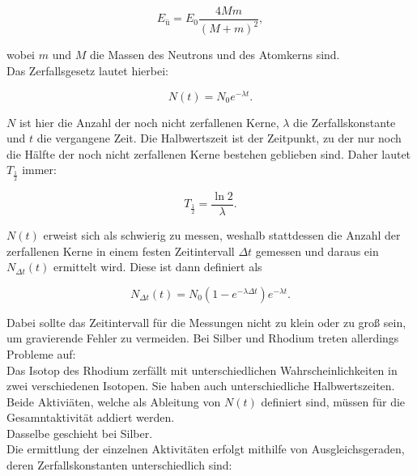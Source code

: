 \begin{equation}
    E_ü = E_0 \frac{4Mm}{(M+m)^2},
\end{equation}

wobei \(m\) und \(M\) die Massen des Neutrons und des Atomkerns sind.\\
Das Zerfallsgesetz lautet hierbei:

\begin{equation}
    N(t) = N_0 e^{-\lambda t}.
\end{equation}

\(N\) ist hier die Anzahl der noch nicht zerfallenen Kerne, \(\lambda\) die Zerfallskonstante und \(t\) die vergangene Zeit. Die Halbwertszeit ist der Zeitpunkt, zu der nur noch die Hälfte der noch nicht zerfallenen Kerne bestehen geblieben sind. Daher lautet \(T_{\frac{1}{2}}\) immer:

\begin{equation}
    T_{\frac{1}{2}} = \frac{\ln{2}}{\lambda}.
    \label{eq:hwz}
\end{equation}

\(N(t)\) erweist sich als schwierig zu messen, weshalb stattdessen die Anzahl der zerfallenen Kerne in einem festen Zeitintervall \(\Delta t\) gemessen und daraus ein \(N_{\Delta t}(t)\) ermittelt wird. Diese ist dann definiert als

\begin{equation}
    N_{\Delta t}(t) = N_0(1-e^{-\lambda \Delta t})e^{-\lambda t}.
\end{equation}

Dabei sollte das Zeitintervall für die Messungen nicht zu klein oder zu groß sein, um gravierende Fehler zu vermeiden. Bei Silber und Rhodium treten allerdings Probleme auf:\\
Das Isotop des Rhodium zerfällt mit unterschiedlichen Wahrscheinlichkeiten in zwei verschiedenen Isotopen. Sie haben auch unterschiedliche Halbwertszeiten. Beide Aktiviäten, welche als Ableitung von \(N(t)\) definiert sind, müssen für die Gesamntaktivität addiert werden.\\
Dasselbe geschieht bei Silber.\\
Die ermittlung der einzelnen Aktivitäten erfolgt mithilfe von Ausgleichsgeraden, deren Zerfallskonstanten unterschiedlich sind:

